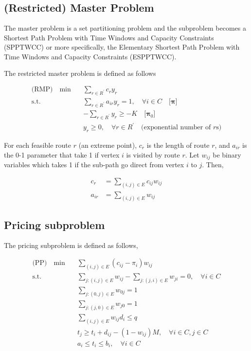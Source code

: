             \subsection{(Restricted) Master Problem}
                The master problem is a set partitioning problem and the subproblem becomes a Shortest Path Problem with Time Windows and Capacity Constraints (SPPTWCC) or more specifically, the Elementary Shortest Path Problem with Time Windows and Capacity Constraints (ESPPTWCC). 
                
                The restricted master problem is defined as follows

                \begin{align*}
                    \text{(RMP)} \quad \min \quad & \sum_{r \in R^\prime} c_r y_r\\
                    \text{s.t.} \quad & \sum_{r \in R^\prime} a_{ir} y_r = 1, \quad \forall i \in C \quad \text{[$\mathbf{\pi}$]}\\
                    & -\sum_{r\in R^\prime} y_r \ge -K  \quad \text{[$\mathbf{\pi}_0$]} \\
                    & y_r \ge 0, \quad \forall r \in R^\prime \quad \text{(exponential number of $r$s)}
                \end{align*}

                For each feasible route $r$ (an extreme point), $c_r$ is the length of route $r$, and $a_{ir}$ is the 0-1 parameter that take 1 if vertex $i$ is visited by route $r$. Let $w_{ij}$ be binary variables which takes 1 if the sub-path go direct from vertex $i$ to $j$. Then,

                \begin{align*}
                    c_r &= \sum_{(i, j) \in E} c_{ij} w_{ij} \\
                    a_{ir} &= \sum_{(i, j) \in E} w_{ij}
                \end{align*}

            \subsection{Pricing subproblem}
                The pricing subproblem is defined as follows,

                \begin{align*}
                    \text{(PP)} \quad \min \quad & \sum_{(i, j) \in E}(c_{ij} - \pi_i) w_{ij} \\
                    \text{s.t.} \quad & \sum_{j: (i, j) \in E} w_{ij} - \sum_{j: (j, i) \in E} w_{ji} = 0, \quad \forall i \in C\\
                    & \sum_{j: (0, j) \in E} w_{0j} = 1 \\
                    & \sum_{j: (j, 0) \in E} w_{j0} = 1 \\
                    & \sum_{(i, j) \in E} w_{ij} d_i \le q \\
                    & t_j \ge t_i + d_{ij} - (1 - w_{ij}) M, \quad \forall i \in C, j \in C\\
                    & a_i \le t_i \le b_i, \quad \forall i \in C
                \end{align*}

